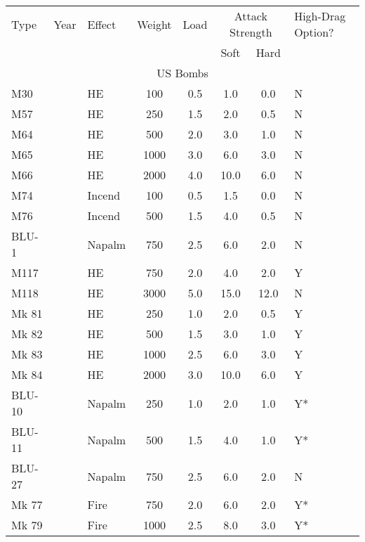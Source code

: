 \begin{twocolumntablefloat}
\begin{twocolumntable}
\begin{tabular}{lclccccl}
\toprule
Type&
Year&
Effect&
Weight&
Load&
\multicolumn{2}{c}{Attack Strength}&High-Drag Option?\\
\cmidrule{6-7}
&&&&&Soft&Hard\\
\midrule
\multicolumn{8}{c}{US Bombs}\\
\midrule
M30     &   &HE     &\phantom{0}100&0.5&\phantom{0}1.0&\phantom{0}0.0&N\\
M57     &   &HE     &\phantom{0}250&1.5&\phantom{0}2.0&\phantom{0}0.5&N\\
M64     &   &HE     &\phantom{0}500&2.0&\phantom{0}3.0&\phantom{0}1.0&N\\
M65     &   &HE     &\phantom{}1000&3.0&\phantom{0}6.0&\phantom{0}3.0&N\\
M66     &   &HE     &\phantom{}2000&4.0&\phantom{}10.0&\phantom{0}6.0&N\\
M74     &   &Incend &\phantom{0}100&0.5&\phantom{0}1.5&\phantom{0}0.0&N\\
M76     &   &Incend &\phantom{0}500&1.5&\phantom{0}4.0&\phantom{0}0.5&N\\
BLU-1   &   &Napalm &\phantom{0}750&2.5&\phantom{0}6.0&\phantom{0}2.0&N\\
M117    &   &HE     &\phantom{0}750&2.0&\phantom{0}4.0&\phantom{0}2.0&Y\\
M118    &   &HE     &\phantom{}3000&5.0&\phantom{}15.0&\phantom{}12.0&N\\
Mk 81   &   &HE     &\phantom{0}250&1.0&\phantom{0}2.0&\phantom{0}0.5&Y\\
Mk 82   &   &HE     &\phantom{0}500&1.5&\phantom{0}3.0&\phantom{0}1.0&Y\\
Mk 83   &   &HE     &\phantom{}1000&2.5&\phantom{0}6.0&\phantom{0}3.0&Y\\
Mk 84   &   &HE     &\phantom{}2000&3.0&\phantom{}10.0&\phantom{0}6.0&Y\\
BLU-10  &   &Napalm &\phantom{0}250&1.0&\phantom{0}2.0&\phantom{0}1.0&Y*\\
BLU-11  &   &Napalm &\phantom{0}500&1.5&\phantom{0}4.0&\phantom{0}1.0&Y*\\
BLU-27  &   &Napalm &\phantom{0}750&2.5&\phantom{0}6.0&\phantom{0}2.0&N\\
Mk 77   &   &Fire   &\phantom{0}750&2.0&\phantom{0}6.0&\phantom{0}2.0&Y*\\
Mk 79   &   &Fire   &\phantom{}1000&2.5&\phantom{0}8.0&\phantom{0}3.0&Y*\\

\end{tabular}
\end{twocolumntable}
\end{twocolumntablefloat}
